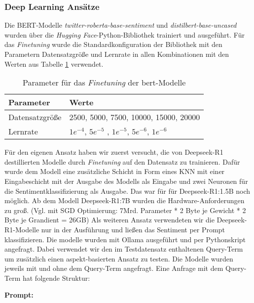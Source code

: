 \subsubsection{Deep Learning Ansätze} \label{sec:deep-learning-ansaetze}
Die BERT-Modelle \textit{twitter-roberta-base-sentiment} und \textit{distilbert-base-uncased} wurden über die \textit{Hugging Face}-Python-Bibliothek trainiert und ausgeführt. Für das \textit{Finetuning} wurde die Standardkonfiguration der Bibliothek mit den Parametern Datensatzgröße und Lernrate in allen Kombinationen mit den Werten aus Tabelle \ref{tab:dl-params} verwendet.
\begin{table}
    \begin{tabular}{ll}
        \toprule
        Parameter       & Werte                                                   \\
        \midrule
        Datensatzgröße  & 2500, 5000, 7500, 10000, 15000, 20000                   \\
        Lernrate        & $1e^{-4}$, $5e^{-5}$ , $1e^{-5}$, $5e^{-6}$, $1e^{-6}$  \\
        \bottomrule
    \end{tabular}
    \caption{
        Parameter für das \textit{Finetuning} der \gls{bert}-Modelle
    }
    \label{tab:dl-params}
\end{table}


Für den eigenen Ansatz haben wir zuerst versucht, die von Deepseek-R1 destillierten Modelle durch \textit{Finetuning} auf den Datensatz zu trainieren. Dafür wurde dem Modell eine zusätzliche Schicht in Form eines KNN mit einer Eingabeschicht mit der Ausgabe des Modells als Eingabe und zwei Neuronen für die Sentimentklassifizierung als Ausgabe.
Das war für für Deepseek-R1:1.5B noch möglich. Ab dem Modell Deepseek-R1:7B wurden die Hardware-Anforderungen zu groß. (Vgl. mit SGD Optimierung: 7Mrd. Parameter * 2 Byte je Gewicht * 2 Byte je Grandient = 26GB)
Als weiteren Ansatz verwendeten wir die Deepseek-R1-Modelle nur in der Ausführung und ließen das Sentiment per Prompt klassifizieren. Die modelle wurden mit Ollama ausgeführt und per Pythonskript angefragt. Dabei verwendet wir den im Testdatensatz enthaltenen Query-Term um zusätzlich einen aspekt-basierten Ansatz zu testen.
Die Modelle wurden jeweils mit und ohne dem Query-Term angefragt. Eine Anfrage mit dem Query-Term hat folgende Struktur:

\textbf{Prompt:} 

